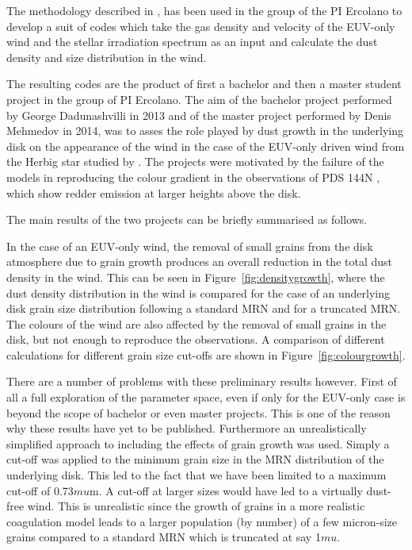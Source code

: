 \documentclass[10pt,fleqn,twoside]{article}
\begin{document}
The methodology described in \citet{2011MNRAS.411.1104O}, has been
used in the group of the PI Ercolano to develop a suit of codes which
take the gas density and velocity of the EUV-only wind and the stellar
irradiation spectrum as an input and calculate the dust density and
size distribution in the wind. 

The resulting codes are the product of first a bachelor and then a master
student project in the group of PI Ercolano. The aim of the bachelor project
performed by George Dadunashvilli in 2013 and of the master project
performed  by Denis Mehmedov in 2014, was to asses the role played by
dust growth in the underlying disk on the appearance of the wind in
the case of the EUV-only driven wind from the Herbig star studied by
\citet{2011MNRAS.411.1104O}. 
The projects were motivated by the failure of the \citet{2011MNRAS.411.1104O} 
models in reproducing the colour gradient in the observations
of PDS 144N \citep[e.g.,][]{2006ApJ...645.1272P}, which show redder emission at
larger heights above the disk. 

The main results of the two projects can be briefly summarised as
follows. 

In the case of an EUV-only wind, the removal of small grains from the disk atmosphere due to grain
growth produces an overall reduction in the total dust density in the
wind. This can be seen in Figure~\ref{fig:densitygrowth}, where the
dust density distribution in the wind is compared for the case of an
underlying disk grain size distribution following a 
standard MRN \citep{1977ApJ...217..425M} and for a truncated 
MRN. The colours of the wind are also affected by the removal of small
grains in the disk, but not enough to reproduce the observations. A
comparison of different calculations for different grain size cut-offs
are shown in Figure~\ref{fig:colourgrowth}. 

There are a number of problems with these preliminary results
however. First of all
a full exploration of the parameter space, even if only for the
EUV-only case is beyond the scope of bachelor or even master
projects. This is one of the reason why these results have yet to be 
published. Furthermore an unrealistically simplified approach to 
including the effects of grain growth was used. Simply a cut-off was
applied to the minimum grain size in the MRN distribution of the
underlying disk. This led to the fact that we have been limited to a
maximum cut-off of 0.73$mu$m. A cut-off at larger sizes would have led
to a virtually dust-free wind. This is unrealistic since the growth of
grains in a more realistic coagulation model leads to a larger population (by
number) of a few micron-size grains compared to a standard MRN which
is truncated at say 1$mu$. 
\end{document}
